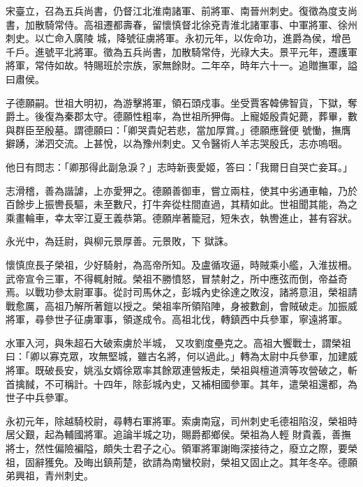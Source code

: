 \begin{pinyinscope}
 宋臺立，召為五兵尚書，仍督江北淮南諸軍、前將軍、南晉州刺史。復徵為度支尚書，加散騎常侍。高祖遷都壽春，留懷慎督北徐兗青淮北諸軍事、中軍將軍、徐州刺史。以亡命入廣陵
 城，降號征虜將軍。永初元年，以佐命功，進爵為侯，增邑千戶。進號平北將軍。徵為五兵尚書，加散騎常侍，光祿大夫。景平元年，遷護軍將軍，常侍如故。特賜班於宗族，家無餘財。二年卒，時年六十一。追贈撫軍，謚曰肅侯。



 子德願嗣。世祖大明初，為游擊將軍，領石頭戍事。坐受賈客韓佛智貨，下獄，奪爵土。後復為秦郡太守。德願性粗率，為世祖所狎侮。上寵姬殷貴妃薨，葬畢，數與群臣至殷墓。謂德願曰：「卿哭貴妃若悲，當加厚賞。」德願應聲便
 號慟，撫膺擗踴，涕泗交流。上甚悅，以為豫州刺史。又令醫術人羊志哭殷氏，志亦嗚咽。



 他日有問志：「卿那得此副急淚？」志時新喪愛姬，答曰：「我爾日自哭亡妾耳。」



 志滑稽，善為諧謔，上亦愛狎之。德願善御車，嘗立兩柱，使其中劣通車軸，乃於百餘步上振轡長驅，未至數尺，打牛奔從柱間直過，其精如此。世祖聞其能，為之乘畫輪車，幸太宰江夏王義恭第。德願岸著籠冠，短朱衣，執轡進止，甚有容狀。



 永光中，為廷尉，與柳元景厚善。元景敗，下
 獄誅。



 懷慎庶長子榮祖，少好騎射，為高帝所知。及盧循攻逼，時賊乘小艦，入淮拔柵。武帝宣令三軍，不得輒射賊。榮祖不勝憤怒，冒禁射之，所中應弦而倒，帝益奇焉。以戰功參太尉軍事。從討司馬休之，彭城內史徐達之敗沒，諸將意沮，榮祖請戰愈厲，高祖乃解所著鎧以授之。榮祖率所領陷陣，身被數創，會賊破走。加振威將軍，尋參世子征虜軍事，領遂成令。高祖北伐，轉鎮西中兵參軍，寧遠將軍。



 水軍入河，與朱超石大破索虜於半城，
 又攻劉度壘克之。高祖大饗戰士，謂榮祖曰：「卿以寡克眾，攻無堅城，雖古名將，何以過此。」轉為太尉中兵參軍，加建威將軍。既破長安，姚泓女婿徐眾率其餘眾連營叛走，榮祖與檀道濟等攻營破之，斬首擒馘，不可稱計。十四年，除彭城內史，又補相國參軍。其年，遣榮祖還都，為世子中兵參軍。



 永初元年，除越騎校尉，尋轉右軍將軍。索虜南寇，司州刺史毛德祖陷沒，榮祖時居父艱，起為輔國將軍。追論半城之功，賜爵都鄉侯。榮祖為人輕
 財貴義，善撫將士，然性偏險褊隘，頗失士君子之心。領軍將軍謝晦深接待之，廢立之際，要榮祖，固辭獲免。及晦出鎮荊楚，欲請為南蠻校尉，榮祖又固止之。其年冬卒。德願弟興祖，青州刺史。




\end{pinyinscope}
